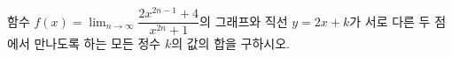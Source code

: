 함수 $f(x)=\displaystyle\lim_{n\to\infty}\dfrac{2x^{2n-1}+4}{x^{2n}+1}$의 그래프와 직선 $y=2x+k$가 서로 다른 두 점에서 만나도록 하는 모든 정수 $k$의 값의 합을 구하시오. 
